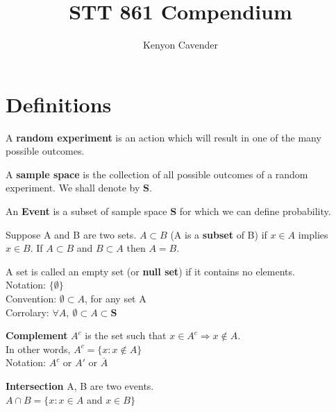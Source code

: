 \documentclass[14pt, oneside, letterpaper]{notes}
\begin{document}
\title{STT 861 Compendium}
\author{Kenyon Cavender}
\maketitle

\section*{Definitions}

\begin{mydef}
  A \textbf{random experiment} is an action which will result 
  in one of the many possible outcomes. 
\end{mydef}

\begin{mydef}
  A \textbf{sample space} is the collection of all possible 
  outcomes of a random experiment.  We shall denote by \textbf{S}.
\end{mydef}

\begin{mydef}
  An \textbf{Event} is a subset of sample space \textbf{S} for 
  which we can define probability.
\end{mydef}

\begin{mydef}
  Suppose A and B are two sets.  $A \subset B$ (A is a 
  \textbf{subset} of B) if $x \in A$ implies $x \in B$. 
  If $A \subset B$ and $B \subset A$ then $A=B$.
\end{mydef}

\begin{mydef}
  A set is called an empty set (or \textbf{null set}) if it contains 
  no elements.\\
  \indent Notation: $\{ \emptyset \}$ \\
  \indent Convention: $\emptyset \subset A$, for any set A \\
  \indent Corrolary: $\forall A, \: \emptyset \subset A \subset \textbf{S}$
\end{mydef}

\begin{mydef}
  \textbf{Complement} $A^c$ is the set such that $x \in A^c 
  \Rightarrow x \notin A$.\\
  \indent In other words, $A^c = \{ x : x \notin A \}$ \\
  \indent Notation: $A^c$ or $A'$ or $\overline{A}$
\end{mydef}

\begin{mydef}
  \textbf{Intersection} A, B are two events.  \\
  \indent $A \cap B = \{x: x \in A$ and $x \in B\}$
\end{mydef}
\end{document}
